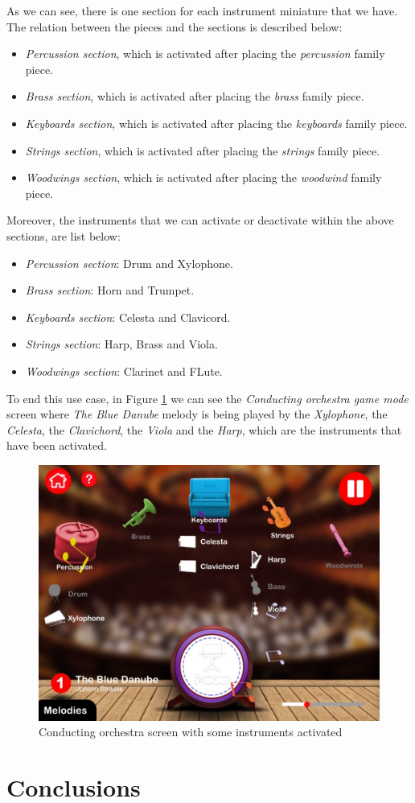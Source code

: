 As we can see, there is one section for each instrument miniature that we have. The relation between the pieces and the sections is described below:
\begin{itemize}
\item \textit{Percussion section}, which is activated after placing the \textit{percussion} family piece.
\item \textit{Brass section}, which is activated after placing the \textit{brass} family piece.
\item \textit{Keyboards section}, which is activated after placing the \textit{keyboards} family piece.
\item \textit{Strings section}, which is activated after placing the \textit{strings} family piece.
\item \textit{Woodwings section}, which is activated after placing the \textit{woodwind} family piece.
\end{itemize}

\newpage

Moreover, the instruments that we can activate or deactivate within the above sections, are list below:
\begin{itemize}
\item \textit{Percussion section}: Drum and Xylophone.
\item \textit{Brass section}: Horn and Trumpet.
\item \textit{Keyboards section}: Celesta and Clavicord.
\item \textit{Strings section}: Harp, Brass and Viola.
\item \textit{Woodwings section}: Clarinet and FLute.
\end{itemize}

To end this use case, in Figure \ref{fig:conducting_some_screen} we can see the \textit{Conducting orchestra game mode} screen where \textit{The Blue Danube} melody is being played by the \textit{Xylophone}, the \textit{Celesta}, the \textit{Clavichord}, the \textit{Viola} and the \textit{Harp}, which are the instruments that have been activated.

\begin{figure}[ht!]
	\centering
	\includegraphics[width=400pt]{graphics/use-case/conducting_some_screen.jpg}
	\caption{Conducting orchestra screen with some instruments activated}
	\label{fig:conducting_some_screen}
\end{figure}

\newpage
\section{Conclusions}

